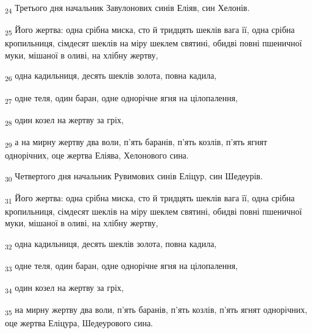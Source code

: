 \begin{tcolorbox}
\textsubscript{24} Третього дня начальник Завулонових синів Еліяв, син Хелонів.
\end{tcolorbox}
\begin{tcolorbox}
\textsubscript{25} Його жертва: одна срібна миска, сто й тридцять шеклів вага її, одна срібна кропильниця, сімдесят шеклів на міру шеклем святині, обидві повні пшеничної муки, мішаної в оливі, на хлібну жертву,
\end{tcolorbox}
\begin{tcolorbox}
\textsubscript{26} одна кадильниця, десять шеклів золота, повна кадила,
\end{tcolorbox}
\begin{tcolorbox}
\textsubscript{27} одне теля, один баран, одне однорічне ягня на цілопалення,
\end{tcolorbox}
\begin{tcolorbox}
\textsubscript{28} один козел на жертву за гріх,
\end{tcolorbox}
\begin{tcolorbox}
\textsubscript{29} а на мирну жертву два воли, п'ять баранів, п'ять козлів, п'ять ягнят однорічних, оце жертва Еліява, Хелонового сина.
\end{tcolorbox}
\begin{tcolorbox}
\textsubscript{30} Четвертого дня начальник Рувимових синів Еліцур, син Шедеурів.
\end{tcolorbox}
\begin{tcolorbox}
\textsubscript{31} Його жертва: одна срібна миска, сто й тридцять шеклів вага її, одна срібна кропильниця, сімдесят шеклів на міру шеклем святині, обидві повні пшеничної муки, мішаної в оливі, на хлібну жертву,
\end{tcolorbox}
\begin{tcolorbox}
\textsubscript{32} одна кадильниця, десять шеклів золота, повна кадила,
\end{tcolorbox}
\begin{tcolorbox}
\textsubscript{33} одне теля, один баран, одне однорічне ягня на цілопалення,
\end{tcolorbox}
\begin{tcolorbox}
\textsubscript{34} один козел на жертву за гріх,
\end{tcolorbox}
\begin{tcolorbox}
\textsubscript{35} на мирну жертву два воли, п'ять баранів, п'ять козлів, п'ять ягнят однорічних, оце жертва Еліцура, Шедеурового сина.
\end{tcolorbox}
